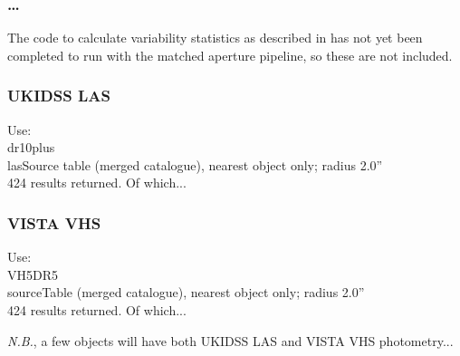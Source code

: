 \documentclass[usenatbib]{mnras}
\begin{document}
\subsubsection{\ldots}

The code to calculate variability statistics as described in \cite{Cross2009} has
not yet been completed to run with the matched aperture pipeline, so these are
not included.





\subsubsection{UKIDSS LAS} 
Use:\\
dr10plus\\
lasSource table (merged catalogue), nearest object only; radius 2.0'' \\
424 results returned. Of which...


\subsubsection{VISTA VHS} 
Use:\\
VH5DR5 \\
sourceTable (merged catalogue), nearest object only; radius 2.0'' \\
424 results returned.  Of which...

{\it N.B.}, a few objects will have both UKIDSS LAS and VISTA VHS photometry...


\iffalse
\subsection{Filter and Survey choices} 
We make some choices when reporting our archival photometry. 
This includes:
\begin{itemize}
\item Report Pan-STARRS1 DR1 $grizy$ wherever we have it; 
\item Report WFCAM $YJHK$ (mainly from the UKIDSS); 
\item Report VIRCAM $YJHK_{\rm S}$ (mainly from the VISTA surveys); 
\item Report VIRCAM $YJH$ over WFCAM  $YJH$; 
\item Report both VIRCAM $K_{\rm S}$ and WFCAM  $K$; 
\item Report DECam $grz$ wherever we have it (mainly from the DES and DECaLS); 
\item Due to lack of coverage, do not report WFCAM $Z$-band. 
\end{itemize}
\fi
\end{document}
